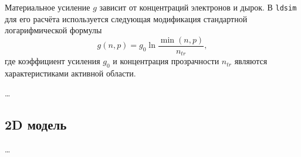 \documentclass{article}
\newcommand{\ldsim}{\texttt{ldsim}}
\begin{document}
Материальное усиление $g$ зависит от концентраций электронов и дырок. В \ldsim{}
для его расчёта используется следующая модификация стандартной логарифмической
формулы
\begin{equation*}
    g(n, p) = g_0 \ln{\frac{\min{(n, p)}}{n_{tr}}},
\end{equation*}
где коэффициент усиления $g_0$ и концентрация прозрачности $n_{tr}$ являются
характеристиками активной области.

\ldots

\subsection{2D модель}
\ldots
\end{document}
